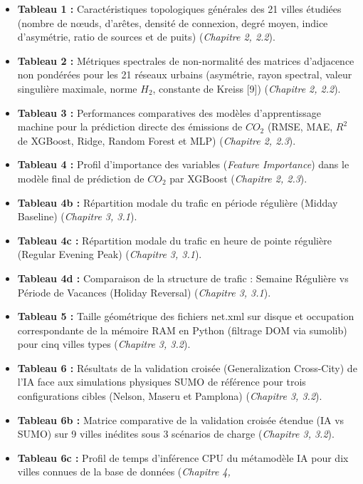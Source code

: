 \documentclass[10pt, a4paper]{article}
\providecommand{\tightlist}{}
\begin{document}
\begin{itemize}
\tightlist
\item
  \textbf{Tableau 1 :} Caractéristiques topologiques générales des 21
  villes étudiées (nombre de nœuds, d'arêtes, densité de connexion,
  degré moyen, indice d'asymétrie, ratio de sources et de puits)
  (\emph{Chapitre 2, 2.2}).
\item
  \textbf{Tableau 2 :} Métriques spectrales de non-normalité des
  matrices d'adjacence non pondérées pour les 21 réseaux urbains
  (asymétrie, rayon spectral, valeur singulière maximale, norme \(H_2\),
  constante de Kreiss {[}9{]}) (\emph{Chapitre 2, 2.2}).
\item
  \textbf{Tableau 3 :} Performances comparatives des modèles
  d'apprentissage machine pour la prédiction directe des émissions de
  \(CO_2\) (RMSE, MAE, \(R^2\) de XGBoost, Ridge, Random Forest et MLP)
  (\emph{Chapitre 2, 2.3}).
\item
  \textbf{Tableau 4 :} Profil d'importance des variables (\emph{Feature
  Importance}) dans le modèle final de prédiction de \(CO_2\) par
  XGBoost (\emph{Chapitre 2, 2.3}).
\item
  \textbf{Tableau 4b :} Répartition modale du trafic en période
  régulière (Midday Baseline) (\emph{Chapitre 3, 3.1}).
\item
  \textbf{Tableau 4c :} Répartition modale du trafic en heure de pointe
  régulière (Regular Evening Peak) (\emph{Chapitre 3, 3.1}).
\item
  \textbf{Tableau 4d :} Comparaison de la structure de trafic : Semaine
  Régulière vs Période de Vacances (Holiday Reversal) (\emph{Chapitre 3,
  3.1}).
\item
  \textbf{Tableau 5 :} Taille géométrique des fichiers net.xml sur
  disque et occupation correspondante de la mémoire RAM en Python
  (filtrage DOM via sumolib) pour cinq villes types (\emph{Chapitre 3,
  3.2}).
\item
  \textbf{Tableau 6 :} Résultats de la validation croisée
  (Generalization Cross-City) de l'IA face aux simulations physiques
  SUMO de référence pour trois configurations cibles (Nelson, Maseru et
  Pamplona) (\emph{Chapitre 3, 3.2}).
\item
  \textbf{Tableau 6b :} Matrice comparative de la validation croisée
  étendue (IA vs SUMO) sur 9 villes inédites sous 3 scénarios de charge
  (\emph{Chapitre 3, 3.2}).
\item
  \textbf{Tableau 6c :} Profil de temps d'inférence CPU du métamodèle IA
  pour dix villes connues de la base de données (\emph{Chapitre 4,
}
\end{itemize}
\end{document}
